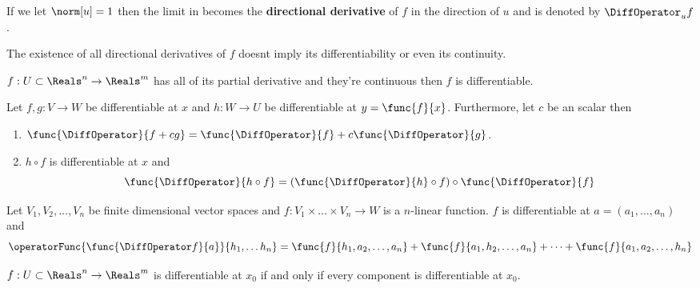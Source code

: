 \begin{definition}
    If we let \(\norm[u] = 1\) then the limit in  becomes the \textbf{directional derivative} of \(f\) in the direction of \(u\) and is denoted by \(\DiffOperator_u f\).
\end{definition}

\begin{remark}
    The existence of all directional derivatives of \(f\) doesnt imply its differentiability or even its continuity.
\end{remark}

\begin{theorem}
    \(f : U \subset \Reals^n \to \Reals^m\) has all of its partial derivative and they're continuous then \(f\) is differentiable.
\end{theorem}

\begin{proposition}
    Let \(f,g : V \to W\) be differentiable at \(x\) and \(h : W \to U\) be differentiable at \(y = \func{f}{x}\). Furthermore, let \(c\) be an scalar then
    \begin{enumerate}
        \item \(\func{\DiffOperator}{ f + cg} = \func{\DiffOperator}{f} + c \func{\DiffOperator}{g}\).
        \item  \(h \circ f\) is differentiable at \(x\) and
              \begin{equation*}
                  \func{\DiffOperator}{ h \circ f} =  \left( \func{\DiffOperator}{h}\circ f \right) \circ \func{\DiffOperator}{ f}
              \end{equation*}
    \end{enumerate}
\end{proposition}


\begin{theorem}
    Let \(V_1, V_2, \dots , V_n\) be finite dimensional vector spaces and \(f: V_1 \times \dots \times V_n \to W\) is a \(n\)-linear function. \(f\) is differentiable at \(a = (a_1, \dots , a_n)\) and
    \begin{equation*}
        \operatorFunc{\func{\DiffOperator f}{a}}{h_1, \dots h_n} = \func{f}{h_1, a_2, \dots, a_n} + \func{f}{a_1, h_2, \dots, a_n} + \dots + \func{f}{a_1, a_2, \dots, h_n}
    \end{equation*}
\end{theorem}


\begin{proposition}
    \(f : U \subset \Reals^n \to \Reals^m\) is differentiable at \(x_0\) if and only if every component is differentiable at \(x_0\).
\end{proposition}

